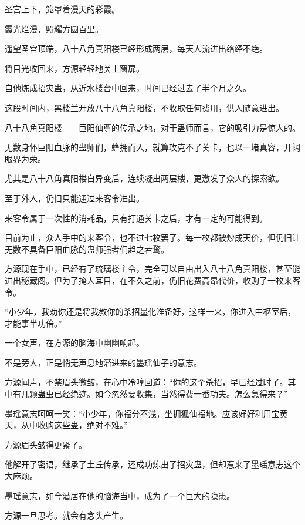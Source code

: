 
\begin{this_body}

圣宫上下，笼罩着漫天的彩霞。

霞光烂漫，照耀方圆百里。

遥望圣宫顶端，八十八角真阳楼已经形成两层，每天人流进出络绎不绝。

将目光收回来，方源轻轻地关上窗扉。

自他炼成招灾蛊，从近水楼台中回来，时间已经过去了半个月之久。

这段时间内，黑楼兰开放八十八角真阳楼，不收取任何费用，供人随意进出。

八十八角真阳楼——巨阳仙尊的传承之地，对于蛊师而言，它的吸引力是惊人的。

无数身怀巨阳血脉的蛊师们，蜂拥而入，就算攻克不了关卡，也以一堵真容，开阔眼界为荣。

尤其是八十八角真阳楼自异变后，连续凝出两层楼，更激发了众人的探索欲。

至于外人，仍旧只能通过来客令进出。

来客令属于一次性的消耗品，只有打通关卡之后，才有一定的可能得到。

目前为止，众人手中的来客令，也不过七枚罢了。每一枚都被炒成天价，但仍旧让无数不具备巨阳血脉的蛊师强者们趋之若鹜。

方源现在手中，已经有了琉璃楼主令，完全可以自由出入八十八角真阳楼，甚至能进出秘藏阁。但为了掩人耳目，在不久之前，仍旧花费高昂代价，收购了一枚来客令。

“小少年，我劝你还是将我教你的杀招墨化准备好，这样一来，你进入中枢室后，才能事半功倍。”

一个女声，在方源的脑海中幽幽响起。

不是旁人，正是悄无声息地潜进来的墨瑶仙子的意志。

方源闻声，不禁眉头微皱，在心中冷哼回道：“你的这个杀招，早已经过时了。其中有几颗蛊虫已经绝迹。如今忽然要收集，当然得费一番功夫。怎么急得来？”

墨瑶意志呵呵一笑：“小少年，你福分不浅，坐拥狐仙福地。应该好好利用宝黄天，从中收购这些蛊，绝对不难。”

方源眉头皱得更紧了。

他解开了密语，继承了土丘传承，还成功炼出了招灾蛊，但却惹来了墨瑶意志这个大麻烦。

墨瑶意志，如今潜居在他的脑海当中，成为了一个巨大的隐患。

方源一旦思考。就会有念头产生。


\end{this_body}
